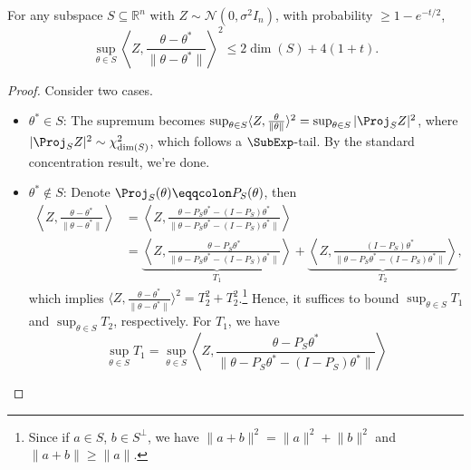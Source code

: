 \begin{lemma}\label{lma:union-of-subspace}
	For any subspace \(S \subseteq \mathbb{R} ^n\) with \(Z \sim \mathcal{N} (0, \sigma ^2 I_n)\), with probability \(\geq 1 - e^{-t / 2}\),
	\[
		\sup _{\theta \in S} \left\langle Z, \frac{\theta - \theta ^{\ast} }{\lVert \theta - \theta ^{\ast} \rVert } \right\rangle ^2 \leq 2 \dim (S) + 4(1+t).
	\]
\end{lemma}
\begin{proof}
	Consider two cases.
	\begin{itemize}
		\item \(\theta ^{\ast} \in S\): The supremum becomes \(\sup _{\theta \in S} \langle Z, \frac{\theta }{\lVert \theta  \rVert } \rangle ^2
		      = \sup _{\theta \in S} \vert \Proj_S Z \vert ^2\), where \(\vert \Proj_S Z \vert ^2 \sim \chi ^2_{\dim (S)}\), which follows a \(\SubExp\)-tail. By the standard concentration result, we're done.
		\item \(\theta ^{\ast} \notin S\): Denote \(\Proj_S(\theta ) \eqqcolon P_S(\theta )\), then
		      \[
			      \begin{split}
				      \left\langle Z, \frac{\theta - \theta ^{\ast} }{\lVert \theta - \theta ^{\ast} \rVert } \right\rangle
				       & = \left\langle Z, \frac{\theta - P_S \theta ^{\ast} - (I - P_S) \theta ^{\ast} }{\lVert \theta - P_S \theta ^{\ast} - (I - P_S) \theta ^{\ast}  \rVert } \right\rangle                                                                                                                                                        \\
				       & = \underbrace{\left\langle Z, \frac{\theta - P_S \theta ^{\ast} }{\lVert \theta - P_S \theta ^{\ast} - (I - P_S) \theta ^{\ast} \rVert } \right\rangle }_{T_1} + \underbrace{\left\langle Z, \frac{(I - P_S ) \theta ^{\ast} }{\lVert \theta - P_S \theta ^{\ast} - (I - P_S) \theta ^{\ast}  \rVert } \right\rangle }_{T_2},
			      \end{split}
		      \]
		      which implies \(\langle Z, \frac{\theta - \theta ^{\ast} }{\lVert \theta - \theta ^{\ast} \rVert } \rangle ^2 = T_2^2 + T_2^2\).\footnote{Since if \(a\in S\), \(b\in S^{\perp} \), we have \(\lVert a + b \rVert ^2 = \lVert a \rVert ^2 + \lVert b \rVert ^2\) and \(\lVert a + b \rVert \geq \lVert a \rVert \).} Hence, it suffices to bound \(\sup _{\theta \in S} T_1\) and \(\sup _{\theta \in S} T_2\), respectively. For \(T_1\), we have
		      \[
			      \sup _{\theta \in S} T_1
			      = \sup _{\theta \in S} \left\langle Z, \frac{\theta - P_S \theta ^{\ast} }{\lVert \theta - P_S \theta ^{\ast} - (I - P_S) \theta ^{\ast} \rVert } \right\rangle
\]
\end{itemize}
\end{proof}
